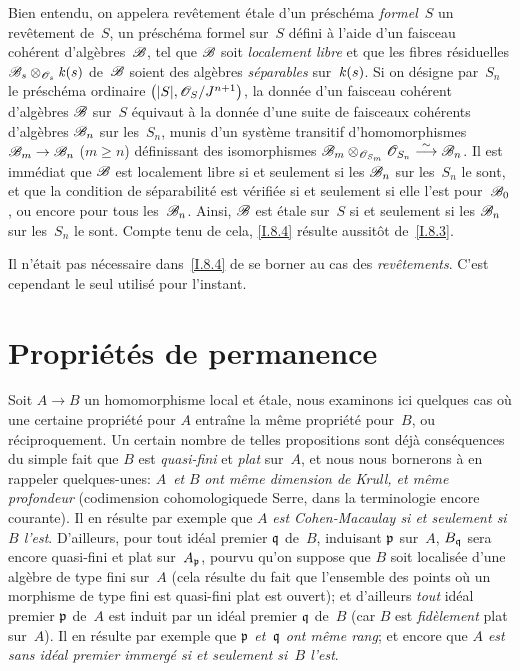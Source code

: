Bien entendu, on appelera rev\^etement \'etale d'un
pr\'esch\'ema \emph{formel}~$S$ un rev\^etement de~$S$, \ie un
pr\'esch\'ema formel sur~$S$ d\'efini \`a l'aide d'un faisceau
coh\'erent d'alg\`ebres~$\cal{B}$, tel que $\cal{B}$ soit
\emph{localement libre} et que les fibres r\'esiduelles $\cal{B}_s
\otimes_{\cal{O}_s} \kres(s)$ de~$\cal{B}$ soient des alg\`ebres
\emph{séparables} sur~$\mathit{k}(s)$. Si on d\'esigne par~$S_n$ le
pr\'esch\'ema ordinaire
$\big(|S|,\cal{O}_S/J^{n+1}\big)$,
la donn\'ee d'un faisceau coh\'erent d'alg\`ebres $\cal{B}$
sur~$S$ \'equivaut \`a la donn\'ee d'une suite de faisceaux
coh\'erents d'alg\`ebres
$\cal{B}_n$
sur
les~$S_n$,
munis d'un syst\`eme transitif d'homomorphismes
$\cal{B}_m\to \cal{B}_n$
($m \geq n$) d\'efinissant des isomorphismes
$\cal{B}_m \otimes_{\cal{O}_{S_m}} \cal{O}_{S_n} \isomto \cal{B}_n$.
Il est imm\'ediat que $\cal{B}$ est localement libre si et seulement
si les $\cal{B}_n$ sur les~$S_n$ le sont, et que la condition de
s\'eparabilit\'e est v\'erifi\'ee si et seulement si elle
l'est pour~$\cal{B}_0$, ou encore pour tous
les~$\cal{B}_n$.
Ainsi, $\cal{B}$ est \'etale sur~$S$ si et seulement si les
$\cal{B}_n$
sur les~$S_n$ le sont. Compte tenu de cela, \ref{I.8.4} r\'esulte
aussit\^ot de~\ref{I.8.3}.

\begin{remarquestar}
Il n'\'etait pas n\'ecessaire dans~\ref{I.8.4} de se borner au cas
des \emph{revêtements}. C'est cependant le seul utilis\'e pour
l'instant.
\end{remarquestar}

\section{Propri\'et\'es de permanence}
\label{I.9}
Soit $A\to B$ un homomorphisme local et \'etale, nous examinons ici
quelques cas o\`u une certaine propri\'et\'e pour $A$
entra\^ine la m\^eme propri\'et\'e pour~$B$, ou
r\'eciproquement.
Un certain nombre de telles propositions sont d\'ej\`a
cons\'equences du simple fait que $B$ est \emph{quasi-fini} et
\emph{plat} sur~$A$, et nous nous bornerons \`a en \og rappeler\fg
quelques-unes: $A$~\emph{et} $B$ \emph{ont même dimension de
Krull, et même profondeur} (\og codimension cohomologique\fg de
Serre, dans la terminologie encore courante). Il en r\'esulte par
exemple que $A$ \emph{est Cohen-Macaulay si et seulement si $B$ l'est}.
D'ailleurs, pour tout id\'eal premier $\mathfrak{q}$ de~$B$, induisant
$\mathfrak{p}$ sur~$A$, $B_{\mathfrak{q}}$ sera encore quasi-fini et plat
sur~$A_{\mathfrak{p}}$, pourvu qu'on suppose que $B$ soit localis\'ee
d'une alg\`ebre de type fini sur~$A$ (cela r\'esulte du fait que
l'ensemble des points o\`u un morphisme de type fini est quasi-fini
\resp plat est ouvert); et d'ailleurs \emph{tout} id\'eal premier
$\mathfrak{p}$ de~$A$ est induit par un id\'eal premier $\mathfrak{q}$
de~$B$ (car $B$ est \emph{fidèlement} plat sur~$A$). Il en
r\'esulte par exemple que \emph{$\mathfrak{p}$ et~$\mathfrak{q}$ ont
même rang}; et encore que \emph{$A$ est sans idéal premier
immergé si et seulement si~$B$ l'est}.

